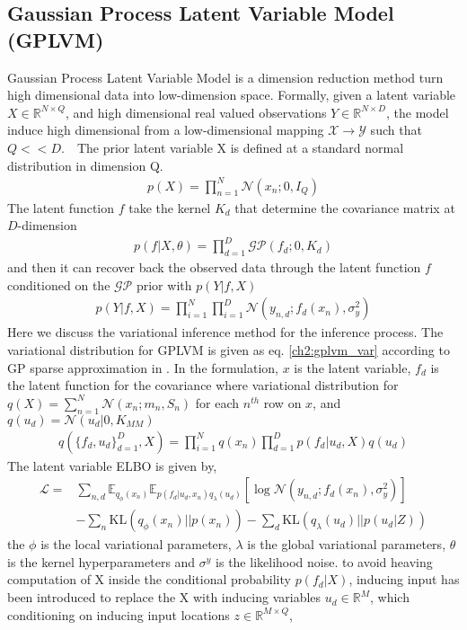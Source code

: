 \subsection{Gaussian Process Latent Variable Model (GPLVM)}
Gaussian Process Latent Variable Model \cite{lawrence_gaussian_2003,titsias_bayesian_2010} is a dimension reduction method turn high dimensional data into low-dimension space. Formally, given a latent variable $ X\in\mathbb{R}^{N\times Q} $, and high dimensional real valued observations $ Y\in\mathbb{R}^{N\times D} $, the model induce high dimensional from a low-dimensional mapping $ \mathcal{X}\rightarrow\mathcal{Y} $ such that $ Q<<D $.　The prior latent variable X is defined at a standard normal distribution in dimension Q.
\begin{align*}
p(X)=\prod_{n=1}^{N}\mathcal{N}(x_n;0,I_Q)
\end{align*}
The latent function $ f $ take the kernel $ K_d $ that determine the covariance matrix at $ D $-dimension
\begin{align*}
p(f|X,\theta)=\prod_{d=1}^{D}\mathcal{GP}(f_d;0,K_d)
\end{align*}
and then it can recover back the observed data through the latent function $ f $ conditioned on the $ \mathcal{GP} $ prior with $ p(Y|f,X) $
\begin{align*}
p(Y|f,X)=\prod_{i=1}^{N}\prod_{i=1}^{D}\mathcal{N}(y_{n,d};f_d(x_n),\sigma_y^2)
\end{align*}
Here we discuss the variational inference method for the inference process. The variational distribution for GPLVM is given as eq. \ref{ch2:gplvm_var} according to GP sparse approximation in \cite{lawrence_learning_2007}. In the formulation, $ x  $ is the latent variable, $ f_d $ is the latent function for the covariance 
where variational distribution for $ q(X)=\sum_{n=1}^{N}\mathcal{N}(x_n;m_n,S_n) $ for each $ n^{th} $ row on $ x $, and $ q(u_d)=\mathcal{N}(u_d|0,K_{MM}) $
\begin{align}\label{ch2:gplvm_var}
q(\{f_d,u_d\}^{D}_{d=1},X) = \prod_{i=1}^{N}q(x_n)\prod_{d=1}^{D}p(f_d|u_d,X)q(u_d)
\end{align}
The latent variable ELBO is given by,
\begin{align}
\mathcal{L}=&\sum_{n,d}\mathbb{E}_{q_\phi(x_n)}\mathbb{E}_{p(f_d|u_d,x_n)q_{\lambda}(u_d)}\left[\log\mathcal{N}(y_{n,d};f_d(x_n),\sigma_y^2)\right]\\
&-\sum_{n}\text{KL}(q_{\phi}(x_n)||p(x_n))-\sum_{d}\text{KL}(q_\lambda(u_d)||p(u_d|Z))
\end{align}
the $ \phi $ is the local variational parameters, $ \lambda $ is the global variational parameters, $ \theta $ is the kernel hyperparameters and $ \sigma^y $ is the likelihood noise.
to avoid heaving computation of X inside the conditional probability $ p(f_d|X) $, inducing input has been introduced \cite{lawrence_learning_2007} to replace the X with inducing variables $ u_d\in\mathbb{R}^M $, which conditioning on inducing input locations $ z\in\mathbb{R}^{M\times Q} $, 
